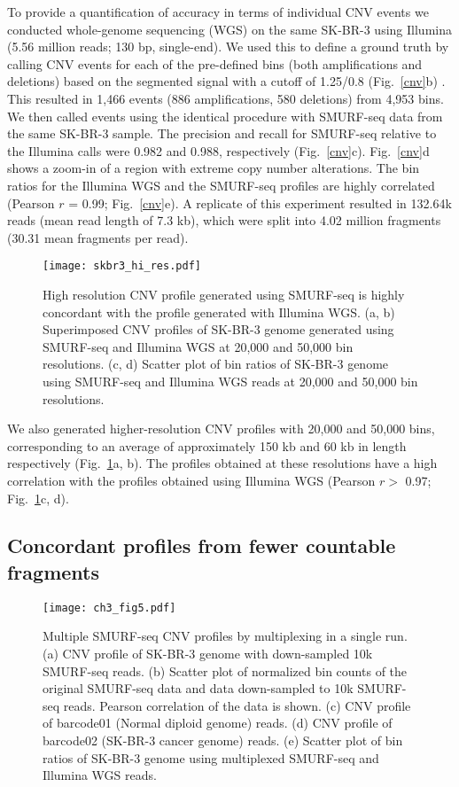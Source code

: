To provide a quantification of accuracy in terms of individual CNV
events we conducted whole-genome sequencing (WGS) on the same SK-BR-3
using Illumina (5.56 million reads; 130 bp, single-end).  We used this
to define a ground truth by calling CNV events for each of the
pre-defined bins (both amplifications and deletions) based on the segmented
signal with a cutoff of 1.25/0.8 (Fig.~\ref{cnv}b)
\citep{dago2014rapid,berry2017potential}. This resulted in 1,466 events
(886 amplifications, 580 deletions) from 4,953 bins. We then called
events using the identical procedure with SMURF-seq data from the same
SK-BR-3 sample. The precision and recall for SMURF-seq relative to the
Illumina calls were 0.982 and 0.988, respectively (Fig.~\ref{cnv}c).
Fig.~\ref{cnv}d shows a zoom-in of a region with extreme copy number
alterations. The bin ratios for the Illumina WGS and the SMURF-seq
profiles are highly correlated (Pearson $r$ = 0.99; Fig.~\ref{cnv}e).
A replicate of this experiment resulted in 132.64k reads (mean read length
of 7.3 kb), which were split into 4.02 million fragments (30.31 mean
fragments per read).

\begin{figure}[t!]
\centering
\texttt{[image: skbr3\_hi\_res.pdf]}
\caption[High resolution CNV profile with SMURF-seq]{
  High resolution CNV profile generated using SMURF-seq is highly concordant
  with the profile generated with Illumina WGS.
  (a, b) Superimposed CNV profiles of SK-BR-3 genome generated using SMURF-seq
  and Illumina WGS at 20,000 and 50,000 bin resolutions.
  (c, d) Scatter plot of bin ratios of SK-BR-3 genome using
  SMURF-seq and Illumina WGS reads at 20,000 and 50,000 bin resolutions. }
  \label{skbr3_hi_res}
\end{figure}

We also generated higher-resolution CNV profiles with 20,000 and 50,000
bins, corresponding to an average of approximately 150 kb and 60 kb in
length respectively (Fig.~\ref{skbr3_hi_res}a, b). The profiles obtained
at these resolutions have a high correlation with the profiles obtained
using Illumina WGS (Pearson $r>$ 0.97; Fig.~\ref{skbr3_hi_res}c, d).



\subsection{Concordant profiles from fewer countable fragments}
\begin{figure}[t!]
\centering
\texttt{[image: ch3\_fig5.pdf]}
\caption[Multiple SMURF-seq CNV profiles by multiplexing in a single run]{
  Multiple SMURF-seq CNV profiles by multiplexing in a single run.
  (a) CNV profile of SK-BR-3 genome with down-sampled 10k SMURF-seq reads.
  (b) Scatter plot of normalized bin counts of the original SMURF-seq
  data and data down-sampled to 10k SMURF-seq reads. Pearson
  correlation of the data is shown.
  (c) CNV profile of barcode01 (Normal diploid genome) reads.
  (d) CNV profile of barcode02 (SK-BR-3 cancer genome) reads.
  (e) Scatter plot of bin ratios of SK-BR-3 genome using
  multiplexed SMURF-seq and Illumina WGS reads.}
\label{cnv_mux}
\end{figure}

